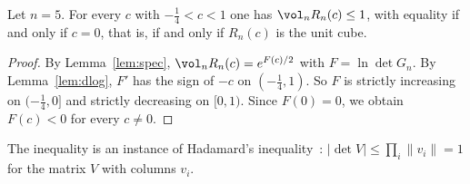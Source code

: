 \begin{theorem}\label{thm:main}
Let $n=5$. For every $c$ with $- \frac{1}{4}<c<1$ one has $\vol_nR_n(c)\le1$, with equality if and only if $c=0$, that is, if and only if $R_n(c)$ is the unit cube.
\end{theorem}
\begin{proof}
By Lemma~\ref{lem:spec}, $\vol_nR_n(c)=e^{F(c)/2}$ with $F=\ln\det G_n$.
By Lemma~\ref{lem:dlog}, $F'$ has the sign of $-c$ on $(- \frac{1}{4},1)$.
So $F$ is strictly increasing on $(- \frac{1}{4},0]$ and strictly decreasing on $[0,1)$.
Since $F(0)=0$, we obtain $F(c)<0$ for every $c\ne0$.
\end{proof}
\begin{remark}
The inequality is an instance of Hadamard's inequality~\cite{hadamard}: $|\det V|\le\prod_i\|v_i\|=1$ for the matrix $V$ with columns $v_i$.
\end{remark}
